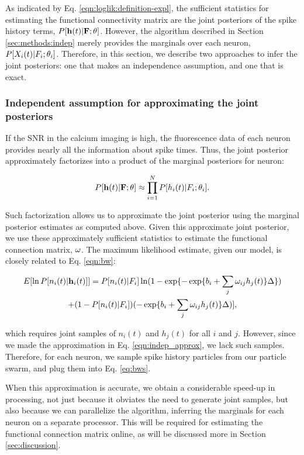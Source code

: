 As indicated by Eq. \eqref{eqn:loglik:definition-expl}, the sufficient statistics for estimating the functional connectivity matrix are the joint posteriors of the spike history terms, $P[\mathbf{h}(t) | {\bf F}; \mathbf{\theta}]$.  However, the algorithm described in Section \ref{sec:methods:indep} merely provides the marginals over each neuron, $P[X_i(t) | F_i; \mathbf{\theta}_i]$.  Therefore, in this section, we describe two approaches to infer the joint posteriors: one that makes an independence assumption, and one that is exact.

\subsubsection{Independent assumption for approximating the joint posteriors}

If the SNR in the calcium imaging is high,  the fluorescence data of each neuron provides nearly all the information about spike times.  Thus, the joint posterior approximately factorizes into a product of the marginal posteriors for neuron:

\begin{equation} \label{eqn:indep_approx}
	P[{\bf h}(t)|{\bf F};\theta]  \approx \prod_{i=1}^N P[h_i(t)|F_i; \mathbf{\theta}_i]. \end{equation}
	
\noindent 

\noindent Such factorization allows us to approximate the joint posterior using the marginal posterior estimates as computed above.  Given this approximate joint posterior, we use these approximately sufficient statistics to estimate the functional connection matrix, $\mathbf{\omega}$.  The maximum likelihood estimate, given our model, is closely related to Eq. \eqref{eqn:bw}:

\begin{multline} \label{eqn:bws}
	E [\ln P[n_i(t) | \mathbf{h}_i(t)]] = P[n_i(t) | F_i] \ln (1-\exp\{-\exp\{b_i + \sum_j \omega_{ij} h_j(t)\}\Delta\})
	\\ +  (1-P[n_i(t) | F_i]) (-\exp\{b_i + \sum_j \omega_{ij} h_j(t)\}\Delta)],
\end{multline}

\noindent which requires joint samples of $n_i(t)$ and $h_j(t)$ for all $i$ and $j$.  However, since we made the approximation in Eq. \eqref{eqn:indep_approx}, we lack such samples.  Therefore, for each neuron, we sample spike history particles from our particle swarm, and plug them into Eq. \eqref{eq:bws}.  


When this approximation is accurate, we obtain a considerable speed-up in processing, not just because it obviates the need to generate joint samples, but also because we can parallelize the algorithm, inferring the marginals for each neuron on a separate processor.  This will be required for estimating the functional connection matrix online, as will be discussed more in Section \ref{sec:discussion}.

